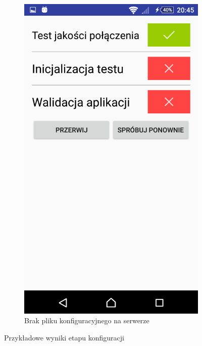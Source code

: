 \documentclass[eng]{mgr}
\begin{document}
\begin{figure}[ht]
\begin{subfigure}{.32\textwidth}
						\includegraphics[width=.9\linewidth]{walidacja_brak_pliku_konfiguracyjnego.png}
						\caption{Brak pliku konfiguracyjnego na serwerze}
						\label{fig:walidacja_brak_pliku}
					\end{subfigure}
					\caption{Przykładowe wyniki etapu konfiguracji}
					\label{fig:wyglad_aplikacji_3}
				\end{figure}
				
\end{document}
